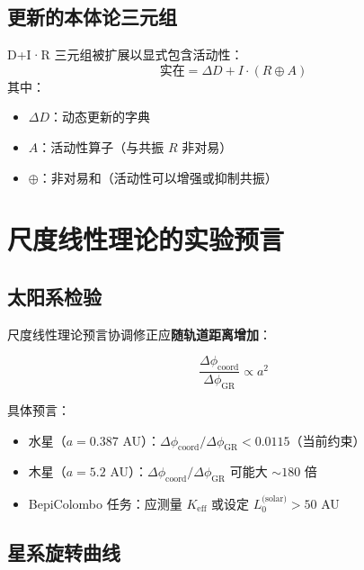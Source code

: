 \documentclass[11pt,a4paper]{article}
\begin{document}
	\subsection{更新的本体论三元组}
	
	D+I·R 三元组被扩展以显式包含活动性：
	\[
	\boxed{\mathrm{实在} = \Delta D + I \cdot (R \oplus A)}
	\]
	其中：
	\begin{itemize}
		\item $\Delta D$：动态更新的字典
		\item $A$：活动性算子（与共振 $R$ 非对易）
		\item $\oplus$：非对易和（活动性可以增强或抑制共振）
	\end{itemize}
	
	
	\section{尺度线性理论的实验预言}
	\label{sec:scale-predictions}
	
	\subsection{太阳系检验}
	
	尺度线性理论预言协调修正应\textbf{随轨道距离增加}：
	
	\begin{equation}
		\frac{\Delta\phi_{\text{coord}}}{\Delta\phi_{\text{GR}}} \propto a^2
	\end{equation}
	
	具体预言：
	\begin{itemize}
		\item 水星（$a = 0.387$ AU）：$\Delta\phi_{\text{coord}}/\Delta\phi_{\text{GR}} < 0.0115$（当前约束）
		\item 木星（$a = 5.2$ AU）：$\Delta\phi_{\text{coord}}/\Delta\phi_{\text{GR}}$ 可能大 $\sim 180$ 倍
		\item BepiColombo 任务：应测量 $K_{\mathrm{eff}}$ 或设定 $L_0^{\text{(solar)}} > 50$ AU
	\end{itemize}
	
	\subsection{星系旋转曲线}
	
\end{document}
